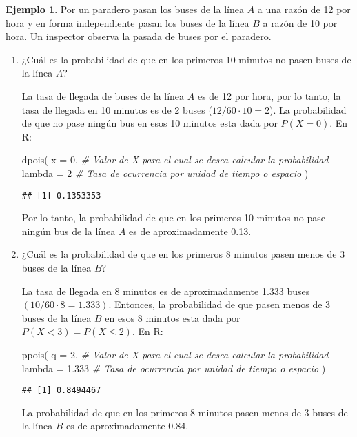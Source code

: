 \documentclass[
]{book}
\newenvironment{Shaded}{\begin{snugshade}}{\end{snugshade}}
\newcommand{\AttributeTok}[1]{\textcolor[rgb]{0.77,0.63,0.00}{#1}}
\newcommand{\CommentTok}[1]{\textcolor[rgb]{0.56,0.35,0.01}{\textit{#1}}}
\newcommand{\DecValTok}[1]{\textcolor[rgb]{0.00,0.00,0.81}{#1}}
\newcommand{\FloatTok}[1]{\textcolor[rgb]{0.00,0.00,0.81}{#1}}
\newcommand{\FunctionTok}[1]{\textcolor[rgb]{0.00,0.00,0.00}{#1}}
\newcommand{\NormalTok}[1]{#1}
\theoremstyle{definition}
\theoremstyle{definition}
\newtheorem{example}{Ejemplo}[chapter]
\theoremstyle{definition}
\theoremstyle{definition}
\theoremstyle{remark}
\begin{document}
\begin{example}

Por un paradero pasan los buses de la línea \(A\) a una razón de 12 por hora y en forma independiente pasan los buses de la línea \(B\) a razón de 10 por hora. Un inspector observa la pasada de buses por el paradero.

\begin{enumerate}
\def\labelenumi{\arabic{enumi}.}
\item
  ¿Cuál es la probabilidad de que en los primeros 10 minutos no pasen buses de la línea \(A\)?

  La tasa de llegada de buses de la línea \(A\) es de 12 por hora, por lo tanto, la tasa de llegada en 10 minutos es de 2 buses (\(12/60\cdot 10=2\)). La probabilidad de que no pase ningún bus en esos 10 minutos esta dada por \(P(X = 0)\). En R:

\begin{Shaded}
\begin{Highlighting}[]
\FunctionTok{dpois}\NormalTok{(}
  \AttributeTok{x =} \DecValTok{0}\NormalTok{, }\CommentTok{\# Valor de X para el cual se desea calcular la probabilidad}
  \AttributeTok{lambda =} \DecValTok{2} \CommentTok{\# Tasa de ocurrencia por unidad de tiempo o espacio}
\NormalTok{)}
\end{Highlighting}
\end{Shaded}

\begin{verbatim}
## [1] 0.1353353
\end{verbatim}

  Por lo tanto, la probabilidad de que en los primeros 10 minutos no pase ningún bus de la línea \(A\) es de aproximadamente 0.13.
\item
  ¿Cuál es la probabilidad de que en los primeros 8 minutos pasen menos de 3 buses de la línea \(B\)?

  La tasa de llegada en 8 minutos es de aproximadamente 1.333 buses \((10/60\cdot 8=1.333)\). Entonces, la probabilidad de que pasen menos de 3 buses de la línea \(B\) en esos 8 minutos esta dada por \(P(X < 3) = P(X\leq 2)\). En R:

\begin{Shaded}
\begin{Highlighting}[]
\FunctionTok{ppois}\NormalTok{(}
  \AttributeTok{q =} \DecValTok{2}\NormalTok{, }\CommentTok{\# Valor de X para el cual se desea calcular la probabilidad}
  \AttributeTok{lambda =} \FloatTok{1.333} \CommentTok{\# Tasa de ocurrencia por unidad de tiempo o espacio}
\NormalTok{)}
\end{Highlighting}
\end{Shaded}

\begin{verbatim}
## [1] 0.8494467
\end{verbatim}

  La probabilidad de que en los primeros 8 minutos pasen menos de 3 buses de la línea \(B\) es de aproximadamente 0.84.
\end{enumerate}

\end{example}
\end{document}
